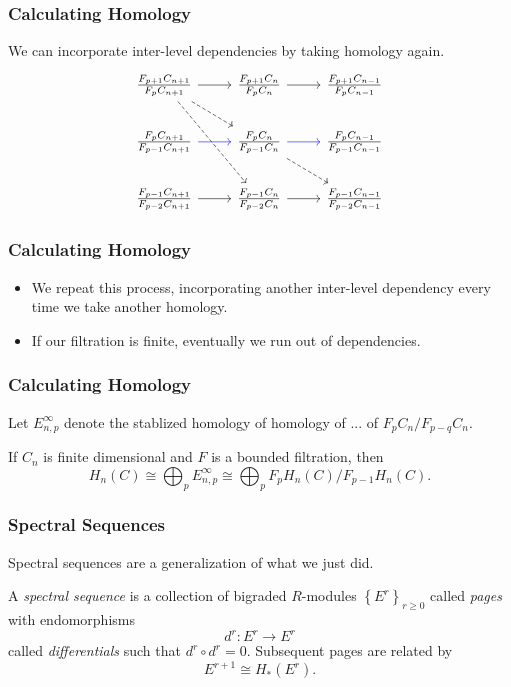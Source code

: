 \documentclass{beamer}
\begin{document}
\begin{frame}[fragile]
	\frametitle{Calculating Homology}

	We can incorporate inter-level dependencies by taking homology again.
	\[
		\begin{tikzcd}
			\frac{F_{p+1}C_{n+1}}{F_{p}C_{n+1}}\rar\arrow[rd,dashed]\arrow[rdd,dashed]&\frac{F_{p+1}C_{n}}{F_{p}C_{n}}\rar&\frac{F_{p+1}C_{n-1}}{F_{p}C_{n-1}}\\
			\frac{F_{p}C_{n+1}}{F_{p-1}C_{n+1}}\rar[blue]&\frac{F_{p}C_{n}}{F_{p-1}C_{n}}\rar[blue]\arrow[rd,dashed]&\frac{F_{p}C_{n-1}}{F_{p-1}C_{n-1}}\\
			\frac{F_{p-1}C_{n+1}}{F_{p-2}C_{n+1}}\rar&\frac{F_{p-1}C_{n}}{F_{p-2}C_{n}}\rar&\frac{F_{p-1}C_{n-1}}{F_{p-2}C_{n-1}}
                \end{tikzcd}
        \]
\end{frame}

\begin{frame}
	\frametitle{Calculating Homology}

	\begin{itemize}
		\item We repeat this process, incorporating another inter-level dependency every time we take another homology.
		\item If our filtration is finite, eventually we run out of dependencies.
	\end{itemize}
\end{frame}

\begin{frame}
	\frametitle{Calculating Homology}

	Let $E_{n,p}^{\infty}$ denote the stablized homology of homology of ... of $F_{p}C_{n}/F_{p-q}C_{n}$.

	\vspace{5mm}

	If $C_{n}$ is finite dimensional and $F$ is a bounded filtration, then
	\[
		H_{n}(C) \cong \bigoplus_{p} E_{n,p}^{\infty} \cong \bigoplus_{p} F_{p}H_{n}(C)/F_{p-1}H_{n}(C).
	\] 
\end{frame}

\begin{frame}
	\frametitle{Spectral Sequences}

	Spectral sequences are a generalization of what we just did.
	\vspace{5mm}

	\begin{definition}
		A \textit{spectral sequence} is a collection of bigraded $R$-modules $\left\{ E^{r} \right\}_{r \geq 0}$ called \textit{pages} with endomorphisms
		\[
		d^{r}:E^{r}\to E^{r}
		\] called \textit{differentials} such that $d^{r}\circ d^{r}=0$. Subsequent pages are related by
		\[
			E^{r+1}\cong H_{*}(E^{r}).
		\] 
	\end{definition}
\end{frame}
\end{document}
